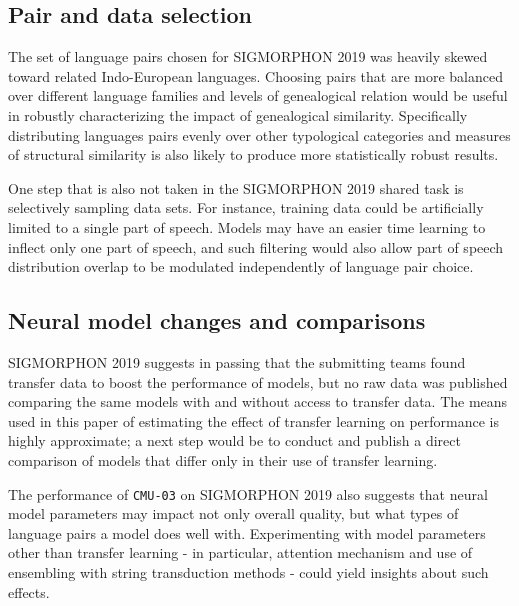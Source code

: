 \subsection{Pair and data selection}

The set of language pairs chosen for SIGMORPHON 2019 was heavily skewed toward related Indo-European languages. Choosing pairs that are more balanced over different language families and levels of genealogical relation would be useful in robustly characterizing the impact of genealogical similarity. Specifically distributing languages pairs evenly over other typological categories and measures of structural similarity is also likely to produce more statistically robust results.

One step that is also not taken in the SIGMORPHON 2019 shared task is selectively sampling data sets. For instance, training data could be artificially limited to a single part of speech. Models may have an easier time learning to inflect only one part of speech, and such filtering would also allow part of speech distribution overlap to be modulated independently of language pair choice. 

\subsection{Neural model changes and comparisons}

SIGMORPHON 2019 suggests in passing that the submitting teams found transfer data to boost the performance of models, but no raw data was published comparing the same models with and without access to transfer data. The means used in this paper of estimating the effect of transfer learning on performance is highly approximate; a next step would be to conduct and publish a direct comparison of models that differ only in their use of transfer learning.

The performance of \texttt{CMU-03} on SIGMORPHON 2019 also suggests that neural model parameters may impact not only overall quality, but what types of language pairs a model does well with. Experimenting with model parameters other than transfer learning - in particular, attention mechanism and use of ensembling with string transduction methods - could yield insights about such effects.